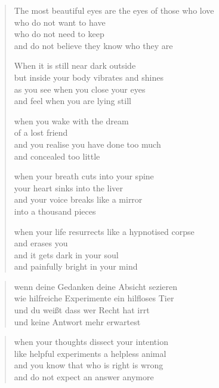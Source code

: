 \begin{verse}

The most beautiful eyes are the eyes of those who love\\
who do not want to have\\
who do not need to keep\\
and do not believe they know who they are

When it is still near dark outside\\
but inside your body vibrates and shines\\
as you see when you close your eyes\\
and feel when you are lying still

when you wake with the dream\\
of a lost friend\\
and you realise you have done too much\\
and concealed too little

when your breath cuts into your spine\\
your heart sinks into the liver\\
and your voice breaks like a mirror\\
into a thousand pieces

when your life resurrects like a hypnotised corpse\\
and erases you\\
and it gets dark in your soul\\
and painfully bright in your mind

\end{verse}

\clearpage

\begin{verse}

wenn deine Gedanken deine Absicht sezieren\\
wie hilfreiche Experimente ein hilfloses Tier\\
und du weißt dass wer Recht hat irrt\\
und keine Antwort mehr erwartest

\end{verse}

\clearpage

\begin{verse}
when your thoughts dissect your intention\\
like helpful experiments a helpless animal\\
and you know that who is right is wrong\\
and do not expect an answer anymore

\end{verse}


